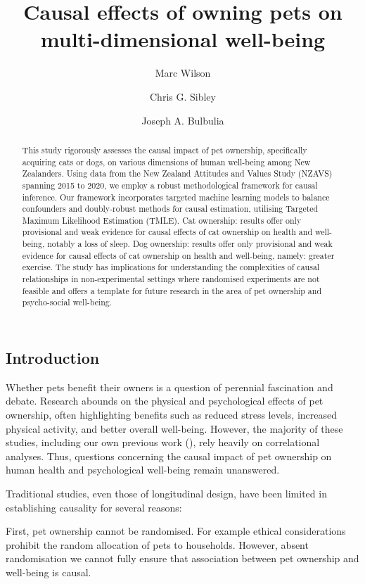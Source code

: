 \documentclass[
  singlecolumn,
  9pt]{article}
\title{Causal effects of owning pets on multi-dimensional well-being}
\author{Marc Wilson}
\affil{%
                  Victoria University of Wellington, New Zealand
              }
\author{Chris G. Sibley}
\affil{%
                  School of Psychology, University of Auckland
              }
\author{Joseph A. Bulbulia}
\affil{%
                  Victoria University of Wellington, New Zealand
              }
\date{}
\begin{document}
\maketitle
\begin{abstract}
This study rigorously assesses the causal impact of pet ownership,
specifically acquiring cats or dogs, on various dimensions of human
well-being among New Zealanders. Using data from the New Zealand
Attitudes and Values Study (NZAVS) spanning 2015 to 2020, we employ a
robust methodological framework for causal inference. Our framework
incorporates targeted machine learning models to balance confounders and
doubly-robust methods for causal estimation, utilising Targeted Maximum
Likelihood Estimation (TMLE). Cat ownership: results offer only
provisional and weak evidence for causal effects of cat ownership on
health and well-being, notably a loss of sleep. Dog ownership: results
offer only provisional and weak evidence for causal effects of cat
ownership on health and well-being, namely: greater exercise. The study
has implications for understanding the complexities of causal
relationships in non-experimental settings where randomised experiments
are not feasible and offers a template for future research in the area
of pet ownership and psycho-social well-being.
\end{abstract}
\subsection{Introduction}\label{introduction}

Whether pets benefit their owners is a question of perennial fascination
and debate. Research abounds on the physical and psychological effects
of pet ownership, often highlighting benefits such as reduced stress
levels, increased physical activity, and better overall well-being.
However, the majority of these studies, including our own previous work
(), rely heavily on
correlational analyses. Thus, questions concerning the causal impact of
pet ownership on human health and psychological well-being remain
unanswered.

Traditional studies, even those of longitudinal design, have been
limited in establishing causality for several reasons:

First, pet ownership cannot be randomised. For example ethical
considerations prohibit the random allocation of pets to households.
However, absent randomisation we cannot fully ensure that association
between pet ownership and well-being is causal.
\end{document}
